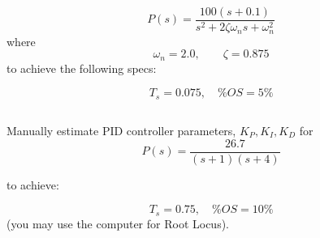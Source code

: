 \documentclass{article}	%
\begin{document}
\[
P(s) = \frac  {100(s+0.1)}   {s^2+2\zeta\omega_ns + \omega_n^2}
\]
where
\[
\omega_n = 2.0, \qquad \zeta = 0.875
\]
to achieve the following specs:

\[
T_s = 0.075, \quad \%OS = 5\%
\]




%
%
%
%
%
%
%




\subsection{}\label{manualdesign2}

Manually estimate PID controller parameters, $K_P, K_I, K_D$ for
\[
P(s) = \frac  {26.7}{(s+1)(s+4)}
\]

to achieve:

\[
T_s = 0.75, \quad \%OS = 10\%
\]
(you may use the computer for Root Locus).
\end{document}
